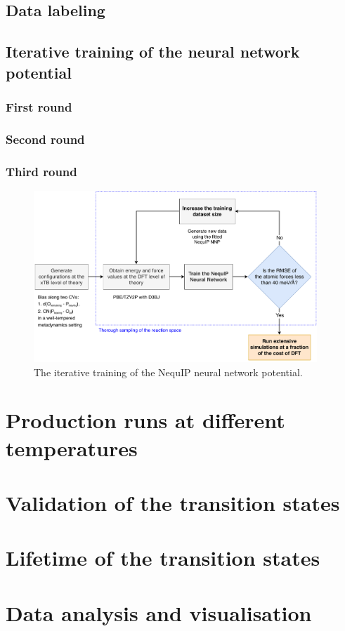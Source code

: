 \subsection{Data labeling}

\subsection{Iterative training of the neural network potential}

\subsubsection{First round}

\subsubsection{Second round}

\subsubsection{Third round}
\begin{figure}[ht]
    \centering
    \includegraphics[width=0.95\textwidth]{Figures/3_Computational_details/workflow_diagram_updated.pdf}
    \caption{The iterative training of the NequIP neural network potential.}
    \label{fig:iterative-training}
\end{figure}


\section{Production runs at different temperatures}



\section{Validation of the transition states}



\section{Lifetime of the transition states}



\section{Data analysis and visualisation}
